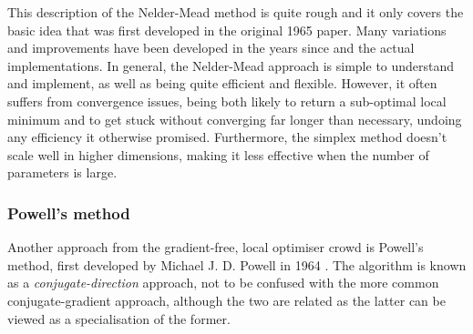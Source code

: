 This description of the Nelder-Mead method is quite rough and it only covers the basic idea that was first developed in the original 1965 paper. Many variations and improvements have been developed in the years since and the actual implementations. In general, the Nelder-Mead approach is simple to understand and implement, as well as being quite efficient and flexible. However, it often suffers from convergence issues, being both likely to return a sub-optimal local minimum and to get stuck without converging far longer than necessary, undoing any efficiency it otherwise promised. Furthermore, the simplex method doesn't scale well in higher dimensions, making it less effective when the number of parameters is large.

\subsubsection{Powell's method}\label{sec:3.1.3.2_Powell}

Another approach from the gradient-free, local optimiser crowd is Powell's method, first developed by Michael J. D. Powell in 1964 \cite{powell_efficient_1964}. The algorithm is known as a \emph{conjugate-direction} approach, not to be confused with the more common conjugate-gradient approach, although the two are related as the latter can be viewed as a specialisation of the former. 

